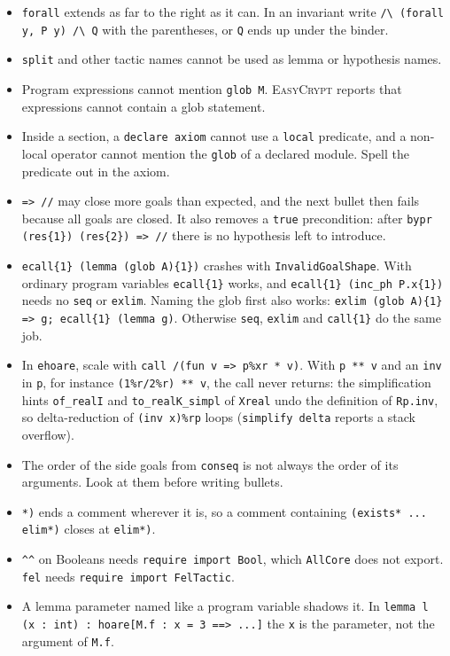 \documentclass[10pt,a4paper]{article}
\newcommand{\ec}{\lstinline[basicstyle=\small\ttfamily]}
\newcommand{\EC}{\textsc{EasyCrypt}}
\begin{document}
\begin{itemize}
  \item \ec|forall| extends as far to the right as it can.
    In an invariant write \ec|/\ (forall y, P y) /\ Q| with the parentheses, or \ec|Q| ends up under the binder.
  \item \ec|split| and other tactic names cannot be used as lemma or hypothesis names.
  \item Program expressions cannot mention \ec|glob M|.
    \EC{} reports that expressions cannot contain a glob statement.
  \item Inside a section, a \ec|declare axiom| cannot use a \ec|local| predicate, and a non-local operator cannot mention the \ec|glob| of a declared module.
    Spell the predicate out in the axiom.
  \item \ec|=> //| may close more goals than expected, and the next bullet then fails because all goals are closed.
    It also removes a \ec|true| precondition: after \ec|bypr (res{1}) (res{2}) => //| there is no hypothesis left to introduce.
  \item \ec|ecall{1} (lemma (glob A){1})| crashes with \ec|InvalidGoalShape|.
    With ordinary program variables \ec|ecall{1}| works, and \ec|ecall{1} (inc_ph P.x{1})| needs no \ec|seq| or \ec|exlim|.
    Naming the glob first also works: \ec|exlim (glob A){1} => g; ecall{1} (lemma g)|.
    Otherwise \ec|seq|, \ec|exlim| and \ec|call{1}| do the same job.
  \item In \ec|ehoare|, scale with \ec|call /(fun v => p%
    With \ec|p ** v| and an \ec|inv| in \ec|p|, for instance \ec|(1%
  \item The order of the side goals from \ec|conseq| is not always the order of its arguments.
    Look at them before writing bullets.
  \item \ec|*)| ends a comment wherever it is, so a comment containing \ec|(exists* ... elim*)| closes at \ec|elim*)|.
  \item \ec|^^| on Booleans needs \ec|require import Bool|, which \ec|AllCore| does not export.
    \ec|fel| needs \ec|require import FelTactic|.
  \item A lemma parameter named like a program variable shadows it.
    In \ec|lemma l (x : int) : hoare[M.f : x = 3 ==> ...]| the \ec|x| is the parameter, not the argument of \ec|M.f|.

\end{itemize}
\end{document}
